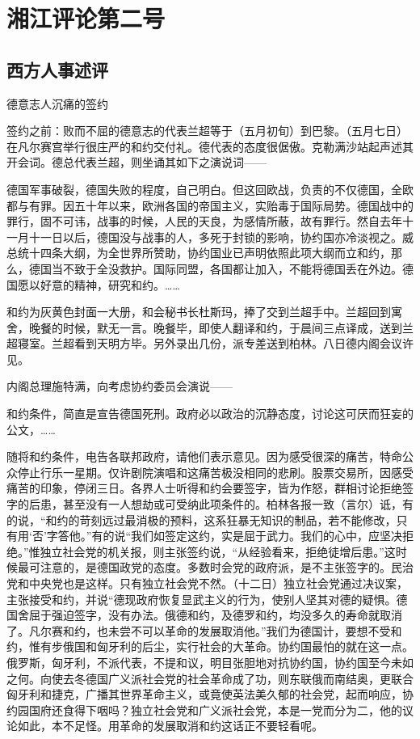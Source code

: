 \section{湘江评论第二号}



\subsection{西方人事述评}

德意志人沉痛的签约

签约之前：败而不屈的德意志的代表兰超等于（五月初旬）到巴黎。（五月七日）在凡尔赛宫举行很庄严的和约交付礼。德代表的态度很倨傲。克勒满沙站起声述其开会词。德总代表兰超，则坐诵其如下之演说词——

德国军事破裂，德国失败的程度，自己明白。但这回欧战，负责的不仅德国，全欧都与有罪。因五十年以来，欧洲各国的帝国主义，实贻毒于国际局势。德国战中的罪行，固不可讳，战事的时候，人民的天良，为感情所蔽，故有罪行。然自去年十一月十一日以后，德国没与战事的人，多死于封锁的影响，协约国亦冷淡视之。威总统十四条大纲，为全世界所赞助，协约国业已声明依照此项大纲而立和约，那么，德国当不致于全没救护。国际同盟，各国都让加入，不能将德国丢在外边。德国愿以好意的精神，研究和约。……

和约为灰黄色封面一大册，和会秘书长杜斯玛，捧了交到兰超手中。兰超回到寓舍，晚餐的时候，默无一言。晚餐毕，即使人翻译和约，于晨间三点译成，送到兰超寝室。兰超看到天明方毕。另外录出几份，派专差送到柏林。八日德内阁会议许见。

内阁总理施特满，向考虑协约委员会演说——

和约条件，简直是宣告德国死刑。政府必以政治的沉静态度，讨论这可厌而狂妄的公文，……

随将和约条件，电告各联邦政府，请他们表示意见。因为感受很深的痛苦，特命公众停止行乐一星期。仅许剧院演唱和这痛苦极没相同的悲刷。股票交易所，因感受痛苦的印象，停闭三日。各界人士听得和约会要签字，皆为作怒，群相讨论拒绝签字的后患，甚至没有一人想劫或可受纳此项条件的。柏林各报一致（言尔）诋，有的说，“和约的苛刻远过最消极的预料，这系狂暴无知识的制品，若不能修改，只有用‘否’字答他。”有的说“我们如签定这约，实是屈于武力。我们的心中，应坚决拒绝。”惟独立社会党的机关报，则主张签约说，“从经验看来，拒绝徒增后患。”这时候最可注意的，是德国政党的态度。多数时会党的政府派，是不主张签字的。民治党和中央党也是这样。只有独立社会党不然。（十二日）独立社会党通过决议案，主张接受和约，并说“德现政府恢复显武主义的行为，使别人坚其对德的疑惧。德国舍屈于强迫签字，没有办法。俄德和约，及德罗和约，均没多久的寿命就取消了。凡尔赛和约，也未尝不可以革命的发展取消他。”我们为德国计，要想不受和约，惟有步俄国和匈牙利的后尘，实行社会的大革命。协约国最怕的就在这一点。俄罗斯，匈牙利，不派代表，不提和议，明目张胆地对抗协约国，协约国至今未如之何。向使去冬德国广义派社会党的社会革命成了功，则东联俄而南结奥，更联合匈牙利和捷克，广播其世界革命主义，或竟使英法美久郁的社会党，起而响应，协约园国府还食得下咽吗？独立社会党和广义派社会党，本是一党而分为二，他的议论如此，本不足怪。用革命的发展取消和约这话正不要轻看呢。

